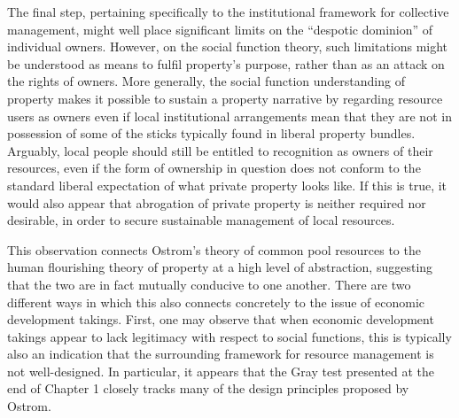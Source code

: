 The final step, pertaining specifically to the institutional framework for collective management, might well place significant limits on the ``despotic dominion'' of individual owners. However, on the social function theory, such limitations might be understood as means to fulfil property's purpose, rather than as an attack on the rights of owners. More generally, the social function understanding of property makes it possible to sustain a property narrative by regarding resource users as owners even if local institutional arrangements mean that they are not in possession of some of the sticks typically found in liberal property bundles. Arguably, local people should still be entitled to recognition as owners of their resources, even if the form of ownership in question does not conform to the standard liberal expectation of what private property looks like. If this is true, it would also appear that abrogation of private property is neither required nor desirable, in order to secure sustainable management of local resources.


This observation connects Ostrom's theory of common pool resources to the human flourishing theory of property at a high level of abstraction, suggesting that the two are in fact mutually conducive to one another. There are two different ways in which this also connects concretely to the issue of economic development takings. First, one may observe that when economic development takings appear to lack legitimacy with respect to social functions, this is typically also an indication that the surrounding framework for resource management is not well-designed. In particular, it appears that the Gray test presented at the end of Chapter 1 closely tracks many of the design principles proposed by Ostrom.


